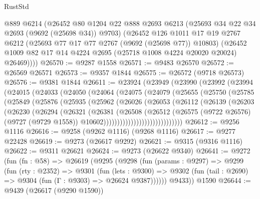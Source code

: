 \begin{lexlean}{RustStd}
\begin{coremodule}
{\begin{coremodule}
{{{{{{{{{{{{{{{{{{{{{{{{{{{{{{{{{{{{{{{{{{{{{{{{{{{{{{{      @889
      @6214
      (@26452
        @80
        @1204
        @22
        @888
        @2693
        @6213
        (@25693 @34 @22 @34 @2693 (@9692 (@25698 @34)) @9703)
        (@26452
          @126
          @1011
          @17
          @19
          @2767
          @6212
          (@25693 @77 @17 @77 @2767 (@9692 (@25698 @77)) @10803)
          (@26452 @1009 @82 @17 @14 @4224 @2695 (@25718 @1008 @4224 @20020 @20024) @26469))))
@26570 := @9287 @1558
@26571 := @9483 @26570
@26572 := @26569 @26571
@26573 := @9357 @1844
@26575 := @26572 (@9718 @26573)
@26576 := @9381 @1844
@26611 := @23924
    (@23949
      (@23990
        (@23992
          (@23994
            (@24015
              (@24033
                (@24050
                  (@24064
                    (@24075
                      (@24079
                        (@25655
                          (@25750
                            (@25785
                              (@25849
                                (@25876
                                  (@25935
                                    (@25962
                                      (@26026
                                        (@26053
                                          (@26112
                                            (@26139
                                              (@26203
                                                (@26230
                                                  (@26294
                                                    (@26321
                                                      (@26381
                                                        (@26508
                                                          (@26512
                                                            (@26575
                                                              (@9722 @26576)
                                                              (@9727 (@9729 @1558))
                                                              @10602)))))))))))))))))))))))))))))
@26612 := @9256 @1116
@26616 := @9258 (@9262 @1116) (@9268 @1116)
@26617 := @9277 @22428
@26619 := @9273 (@26617 @9292)
@26621 := @9315 (@9316 @1116)
@26622 := @9311 @26621
@26624 := @9273 (@26622 @9340)
@26641 := @9272
    (fun (fn : @58) =>
    @26619
      (@9295
        (@9298
          (fun (params : @9297) =>
          @9299
            (fun (rty : @2352) =>
            @9301
              (fun (lets : @9300) =>
              @9302 (fun (tail : @2690) => @9304 (fun (Γ : @9303) => @26624 @9387))))))
        @9433))
    @1590
@26644 := @9439 (@26617 (@9290 @1590))
}}}}}}}}}}}}}}}}}}}}}}}}}}}}}}}}}}}}}}}}}}}}}}}}}}}}}}}
\end{coremodule}}
\end{coremodule}
\end{lexlean}
